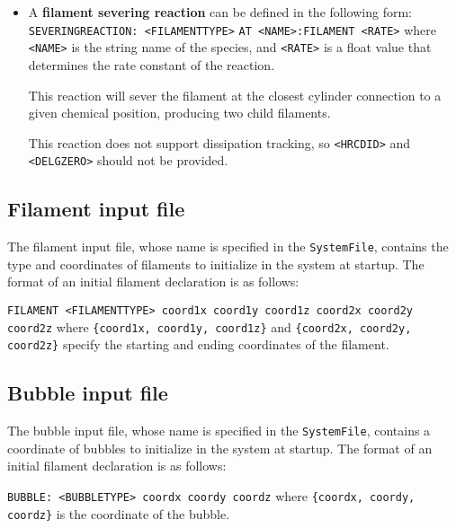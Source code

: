 \documentclass[11pt, oneside]{article}   	%
\begin{document}
\begin{itemize}
	
	\item A \textbf{filament severing reaction} can be defined in the following form:\newline\newline
	\texttt{SEVERINGREACTION: <FILAMENTTYPE>}\newline
	\texttt{AT <NAME>:FILAMENT <RATE>}\newline\newline
	where \texttt{<NAME>} is the string name of the species, and \texttt{<RATE>} is a float value that determines the rate constant of the reaction.
	
	This reaction will sever the filament at the closest cylinder connection to a given chemical position, producing two child filaments.
	
	This reaction does not support dissipation tracking, so \texttt{<HRCDID>} and \texttt{<DELGZERO>} should not be provided.  
	
\end{itemize}

\subsection{Filament input file}

The filament input file, whose name is specified in the \texttt{SystemFile}, contains the type and coordinates of filaments to initialize in the system at startup. The format of an initial filament declaration is as follows:\newline

\texttt{FILAMENT <FILAMENTTYPE> coord1x coord1y coord1z coord2x coord2y coord2z}\newline\newline
\noindent where \texttt{\{coord1x, coord1y, coord1z\}} and \texttt{\{coord2x, coord2y, coord2z\}} specify the starting and 
ending coordinates of the filament.

\subsection{Bubble input file}

The bubble input file, whose name is specified in the \texttt{SystemFile}, contains a coordinate of bubbles to initialize in the system at startup. The format of an initial filament declaration is as follows:\newline

\texttt{BUBBLE: <BUBBLETYPE> coordx coordy coordz}\newline\newline
\noindent where \texttt{\{coordx, coordy, coordz\}} is the coordinate of the bubble.
\end{document}
